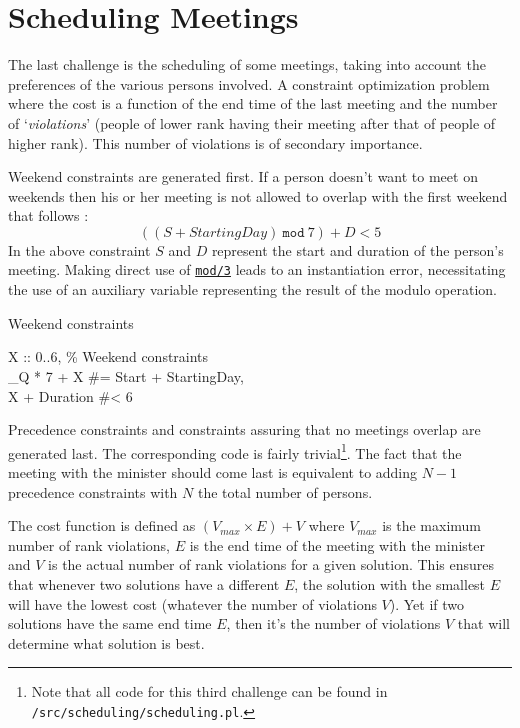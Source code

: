 \section{Scheduling Meetings}

The last challenge is the scheduling of some meetings, taking into account the preferences of the various persons involved. A constraint optimization problem where the cost is a function of the end time of the last meeting and the number of `\textit{violations}' (people of lower rank having their meeting after that of people of higher rank). This number of violations is of secondary importance.\\\par

Weekend constraints are generated first. If a person doesn't want to meet on weekends then his or her meeting is not allowed to overlap with the first weekend that follows :
$$((S + \textit{StartingDay})\ \texttt{mod}\ 7) + D <  5$$
In the above constraint $S$ and $D$ represent the start and duration of the person's meeting. Making direct use of \href{https://www.eclipseclp.org/doc/bips/kernel/arithmetic/mod-3.html}{\texttt{mod/3}} leads to an instantiation error, necessitating the use of an auxiliary variable representing the result of the modulo operation.

\begin{snippet}[H]
\caption{Weekend constraints}\label{weekend}
\small
X :: 0..6, \% Weekend constraints\\
\_Q * 7 + X \#= Start + StartingDay,\\
X + Duration \#< 6
\end{snippet}

Precedence constraints and constraints assuring that no meetings overlap are generated last. The corresponding code is fairly trivial\footnote{Note that all code for this third challenge can be found in \texttt{/src/scheduling/scheduling.pl}.}. The fact that the meeting with the minister should come last is equivalent to adding $N-1$ precedence constraints with $N$ the total number of persons.\\\par

The cost function is defined as $(V_{max}\times E)+V$ where $V_{max}$ is the maximum number of rank violations, $E$ is the end time of the meeting with the minister and $V$ is the actual number of rank violations for a given solution. This ensures that whenever two solutions have a different $E$, the solution with the smallest $E$ will have the lowest cost (whatever the number of violations $V$). Yet if two solutions have the same end time $E$, then it's the number of violations $V$ that will determine what solution is best.

